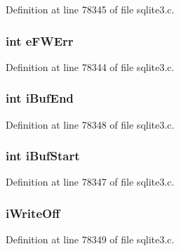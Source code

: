 Definition at line 78345 of file sqlite3.\+c.

\hypertarget{struct_pma_writer_a328c9f566a5d1c3b17c5c7a19cb5db26}{}
\subsubsection[{e\+F\+W\+Err}]{\setlength{\rightskip}{0pt plus 5cm}int e\+F\+W\+Err}\label{struct_pma_writer_a328c9f566a5d1c3b17c5c7a19cb5db26}


Definition at line 78344 of file sqlite3.\+c.

\hypertarget{struct_pma_writer_aca5156f704fce330d23c4423716cf2a3}{}
\subsubsection[{i\+Buf\+End}]{\setlength{\rightskip}{0pt plus 5cm}int i\+Buf\+End}\label{struct_pma_writer_aca5156f704fce330d23c4423716cf2a3}


Definition at line 78348 of file sqlite3.\+c.

\hypertarget{struct_pma_writer_adb6e2f168fc6b50afd7c5a4b080faa44}{}
\subsubsection[{i\+Buf\+Start}]{\setlength{\rightskip}{0pt plus 5cm}int i\+Buf\+Start}\label{struct_pma_writer_adb6e2f168fc6b50afd7c5a4b080faa44}


Definition at line 78347 of file sqlite3.\+c.

\hypertarget{struct_pma_writer_a369b704e04259abc97d1704c7e11939a}{}
\subsubsection[{i\+Write\+Off}]{ i\+Write\+Off}\label{struct_pma_writer_a369b704e04259abc97d1704c7e11939a}


Definition at line 78349 of file sqlite3.\+c.

\hypertarget{struct_pma_writer_aaa5118b1ad1ecd130e422b18371df061}{}
